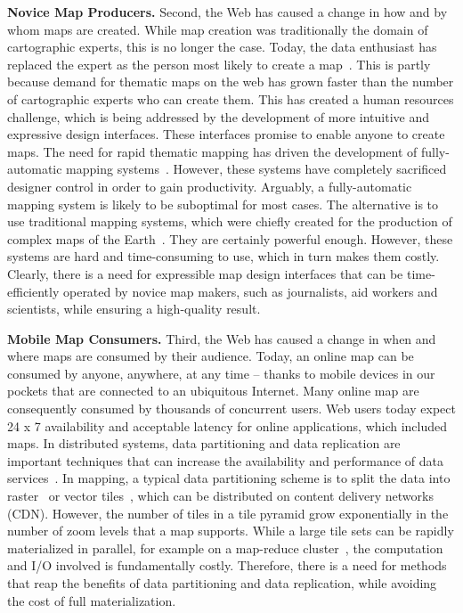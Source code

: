 \documentclass[11pt, oneside]{report}
\newcommand{\minisec}[1]{\noindent\textbf{#1.}}
\begin{document}
{\minisec{Novice Map Producers}
Second, the Web has caused a change in how and by whom maps are created. While map creation was traditionally the domain of cartographic experts, this is no longer the case. Today, the data enthusiast has replaced the expert as the person most likely to create a map~\cite{hanrahan2012enthusiast}. This is partly because demand for thematic maps on the web has grown faster than the number of cartographic experts who can create them. This has created a human resources challenge, which is being addressed by the development of more intuitive and expressive design interfaces. These interfaces promise to enable anyone to create maps. The need for rapid thematic mapping has driven the development of fully-automatic mapping systems~\cite{sarma2012fusiontables,nutanong2012multiresolution}. However, these systems have completely sacrificed designer control in order to gain productivity. Arguably, a fully-automatic mapping system is likely to be suboptimal for most cases. The alternative is to use traditional mapping systems, which were chiefly created for the production of complex maps of the Earth~\cite{lamy1999application,ware2003generalization_sa}. They are certainly powerful enough. However, these systems are hard and time-consuming to use, which in turn makes them costly. Clearly, there is a need for expressible map design interfaces that can be time-efficiently operated by novice map makers, such as journalists, aid workers and scientists, while ensuring a high-quality result.

\minisec{Mobile Map Consumers}
Third, the Web has caused a change in when and where maps are consumed by their audience. Today, an online map can be consumed by anyone, anywhere, at any time -- thanks to mobile devices in our pockets that are connected to an ubiquitous Internet. Many online map are consequently consumed by thousands of concurrent users. Web users today expect 24 x 7 availability and acceptable latency for online applications, which included maps. In distributed systems, data partitioning and data replication are important techniques that can increase the availability and performance of data services~\cite{barroso2009datacenter,dilley2002cdn}. In mapping, a typical data partitioning scheme is to split the data into raster~\cite{mbtile12} or vector tiles~\cite{gaffuri12vectortiles}, which can be distributed on content delivery networks (CDN). However, the number of tiles in a tile pyramid grow exponentially in the number of zoom levels that a map supports. While a large tile sets can be rapidly materialized in parallel, for example on a map-reduce cluster~\cite{dean04mapreduce,dean2009designs}, the computation and I/O involved is fundamentally costly. Therefore, there is a need for methods that reap the benefits of data partitioning and data replication, while avoiding the cost of full materialization.


}
\end{document}

